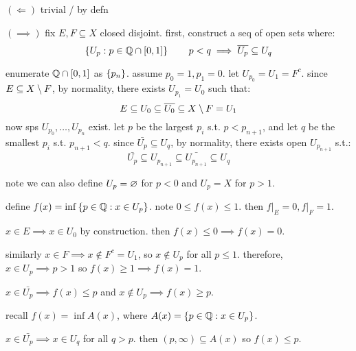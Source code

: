 \begin{pf}[source=Primary Source Material]
    $(\Longleftarrow)$ trivial / by defn

    $(\implies)$ fix $E,F\subseteq X$ closed disjoint.
    first, construct a seq of open sets where:
    \begin{equation*}
        \left\{{U_{p}:p\in\mathbb{Q}\cap[0,1]}\right\} \qquad p<q\implies\overline{U_{p}}\subseteq U_{q}
    \end{equation*}
    \begin{block}
        enumerate $\mathbb{Q}\cap[0,1]$ as $\left\{{p_{n}}\right\}$.
        assume $p_{0}=1,p_{1}=0$. let $U_{p_{0}}=U_{1}=F^{c}$.
        since $E\subseteq X\setminus F$, by normality, there exists $U_{p_{1}}=U_{0}$
        such that:
        \begin{equation*}
            E\subseteq U_{0}\subseteq\overline{U_{0}}\subseteq X\setminus F=U_{1}
        \end{equation*}
        now sps $U_{p_{0}},\dots,U_{p_{n}}$ exist.
        let $p$ be the largest $p_{i}$ s.t. $p<p_{n+1}$, and
        let $q$ be the smallest $p_{i}$ s.t. $p_{n+1}<q$.
        since $\bar{U_{p}}\subseteq U_{q}$, by normality, there exists open
        $U_{p_{n+1}}$ s.t.:
        \begin{equation*}
            \bar{U_{p}}\subseteq U_{p_{n+1}}\subseteq\bar{U_{p_{n+1}}}
            \subseteq U_{q}
        \end{equation*}
    \end{block}
    note we can also define $U_{p}=\varnothing$ for $p<0$ and $U_{p}=X$ for $p>1$.

    define $f(x)=\inf\left\{{p\in\mathbb{Q}:x\in U_{p}}\right\}$. note $0\leq f(x)\leq1$.
    then $f\rvert_{E}=0,f\rvert_{F}=1$.
    \begin{block}
        $x\in E\implies x\in U_{0}$ by construction.
        then $f(x)\leq0\implies f(x)=0$.

        similarly $x\in F\implies x\notin F^{c}=U_{1}$, so
        $x\notin U_{p}$ for all $p\leq1$.
        therefore, $x\in U_{p}\implies p>1$ so $f(x)\geq1\implies f(x)=1$.
    \end{block}
    $x\in\bar{U_{p}}\implies f(x)\leq p$ and
    $x\notin U_{p}\implies f(x)\geq p$.
    \begin{block}
        recall $f(x)=\inf A(x)$, where $A(x)=\left\{{p\in\mathbb{Q}:x\in U_{p}}\right\}$.

        $x\in\bar{U_{p}}\implies x\in U_{q}$ for all $q>p$.
        then $(p,\infty)\subseteq A(x)$ so $f(x)\leq p$.


\end{block}
\end{pf}
